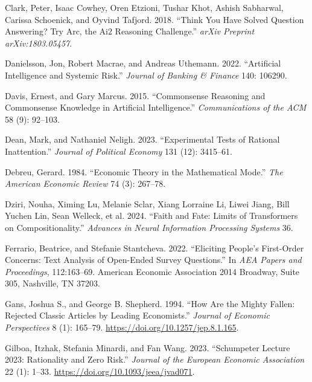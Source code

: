 \documentclass[
]{article}
\newlength{\cslhangindent}
\newenvironment{CSLReferences}[2] %
 {\begin{list}{}{%
  \setlength{\itemindent}{0pt}
  \setlength{\leftmargin}{0pt}
  \setlength{\parsep}{0pt}
  \ifodd #1
   \setlength{\leftmargin}{\cslhangindent}
   \setlength{\itemindent}{-1\cslhangindent}
  \fi
  \setlength{\itemsep}{#2\baselineskip}}}
 {\end{list}}
\begin{document}
\begin{CSLReferences}{1}{0}
Clark, Peter, Isaac Cowhey, Oren Etzioni, Tushar Khot, Ashish Sabharwal,
Carissa Schoenick, and Oyvind Tafjord. 2018. {``Think You Have Solved
Question Answering? Try Arc, the Ai2 Reasoning Challenge.''} \emph{arXiv
Preprint arXiv:1803.05457}.

Danielsson, Jon, Robert Macrae, and Andreas Uthemann. 2022.
{``Artificial Intelligence and Systemic Risk.''} \emph{Journal of
Banking \& Finance} 140: 106290.

Davis, Ernest, and Gary Marcus. 2015. {``Commonsense Reasoning and
Commonsense Knowledge in Artificial Intelligence.''}
\emph{Communications of the ACM} 58 (9): 92--103.

Dean, Mark, and Nathaniel Neligh. 2023. {``Experimental Tests of
Rational Inattention.''} \emph{Journal of Political Economy} 131 (12):
3415--61.

Debreu, Gerard. 1984. {``Economic Theory in the Mathematical Mode.''}
\emph{The American Economic Review} 74 (3): 267--78.

Dziri, Nouha, Ximing Lu, Melanie Sclar, Xiang Lorraine Li, Liwei Jiang,
Bill Yuchen Lin, Sean Welleck, et al. 2024. {``Faith and Fate: Limits of
Transformers on Compositionality.''} \emph{Advances in Neural
Information Processing Systems} 36.

Ferrario, Beatrice, and Stefanie Stantcheva. 2022. {``Eliciting People's
First-Order Concerns: Text Analysis of Open-Ended Survey Questions.''}
In \emph{AEA Papers and Proceedings}, 112:163--69. American Economic
Association 2014 Broadway, Suite 305, Nashville, TN 37203.

Gans, Joshua S., and George B. Shepherd. 1994. {``How Are the Mighty
Fallen: Rejected Classic Articles by Leading Economists.''}
\emph{Journal of Economic Perspectives} 8 (1): 165--79.
\url{https://doi.org/10.1257/jep.8.1.165}.

Gilboa, Itzhak, Stefania Minardi, and Fan Wang. 2023. {``{Schumpeter
Lecture 2023: Rationality and Zero Risk}.''} \emph{Journal of the
European Economic Association} 22 (1): 1--33.
\url{https://doi.org/10.1093/jeea/jvad071}.


\end{CSLReferences}
\end{document}
